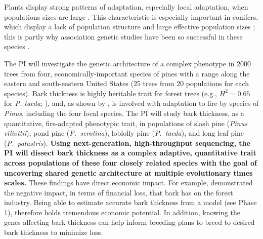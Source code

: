Plants display strong patterns of adaptation, especially local adaptation, when populations sizes are large \citep{Leimu:2008fb}.
This characteristic is especially important in conifers, which display a lack of population structure and large effective population 
sizes \citep{Neale:2004hi}; this is partly why association genetic studies have been so successful in these species 
\citep{Gupta:2005fx,GonzalezMartinez:2006ij,GonzalezMartinez:2007gy, Eckert:2009hh, Wegrzyn:2010dd, Eckert:2010hd,Eckert:2012cw}.

The PI will investigate the genetic architecture of a complex phenotype in 2000 trees from four, economically-important 
species of pines with a range along the eastern and south-eastern United States (25 trees from 20 populations for each species).
Bark thickness is highly heritable trait for forest trees (e.g., $H^2 = 0.65$ for \emph{P. taeda}; \citet{Pederick1970}), and, as shown by 
\citet{He:2012bz}, is involved with adaptation to fire by species of \emph{Pinus}, including the four focal species.
The PI will study bark thickness, as a quantitative, fire-adapted phenotypic trait, in populations of slash 
pine (\emph{Pinus elliottii}), pond pine (\emph{P.\ serotina}), loblolly pine (\emph{P.\ taeda}), and long leaf pine 
(\emph{P.\ palustris}).  \textbf{Using next-generation, high-throughput sequencing, the PI will dissect bark thickness as a complex 
adaptive, quantitative trait across populations of these four closely related species with the goal of uncovering shared genetic 
architecture at multiple evolutionary times scales.}  These findings have direct economic impact.  For example, \citet{Marshall:2006wl} 
demonstrated the negative impact, in terms of financial loss, that bark has on the forest industry.  Being able to estimate accurate 
bark thickness from a model (see Phase 1), therefore holds tremendous economic potential.  In addition, knowing the genes affecting bark 
thickness can help inform breeding plans to breed to desired bark thickness to minimize loss.

